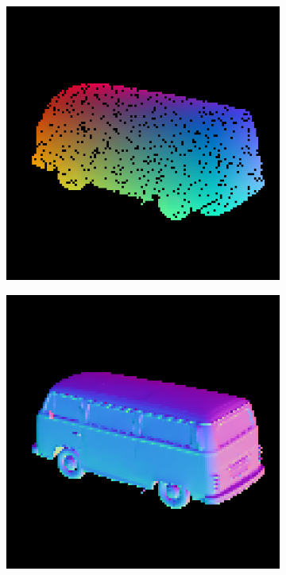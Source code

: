 \begin{figure}
	
	\begin{subfigure}[b]{0.24\linewidth}
		\includegraphics[width=\linewidth]{./Figures/gcnn_synthetic/fancy_eval_9_point_cloud_noise.png}

	\end{subfigure}
	\begin{subfigure}[b]{0.24\linewidth}
		\includegraphics[width=\linewidth]{./Figures/gcnn_synthetic/fancy_eval_9_groundtruth.png}


\end{subfigure}
\end{figure}
